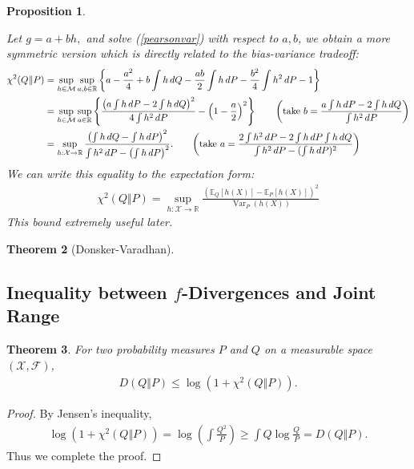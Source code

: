 \documentclass{article}
\numberwithin{equation}{section}
\newcommand{\E}{\mathbb{E}}
\newcommand{\bbR}{\mathbb{R}}
\DeclareMathOperator{\var}{Var}
\theoremstyle{plain}
\newtheorem{theorem}{Theorem}[section]
\newtheorem{proposition}[theorem]{Proposition}
\theoremstyle{definition}
\begin{document}
\begin{proposition}
\begin{itemize}
	Let $g = a+bh,$ and solve (\ref{pearsonvar}) with respect to $a,b$, we obtain a more symmetric version which is directly related to the bias-variance tradeoff:
	\begin{align*}
		\chi^2(Q\Vert P) &=\sup_{h\in\mathcal{M}}\sup_{a,b\in\bbR}\left\{a-\frac{a^2}{4}+b\int h\,dQ -\frac{ab}{2}\int h\,dP-\frac{b^2}{4}\int h^2\,dP - 1\right\}\\
		&=\sup_{h\in\mathcal{M}}\sup_{a\in\bbR}\left\{\frac{\left(a\int h\,dP-2\int h\,dQ\right)^2}{4\int h^2\,dP}-\left(1-\frac{a}{2}\right)^2\right\}\tag*{$\displaystyle\biggl(\text{take}\ b=\frac{a\int h\,dP-2\int h\,dQ}{\int h^2\,dP}\biggr)$}\\
		&= \sup_{h:\mathcal{X}\to\mathbb{R}}\frac{\left(\int h\,dQ-\int h\,dP\right)^2}{\int h^2\,dP - \left(\int h\,dP\right)^2}.\tag*{$\displaystyle\biggl(\text{take}\ a=\frac{2\int h^2\,dP-2\int h\,dP\int h\,dQ}{\int h^2\,dP-(\int h\,dP)^2}\biggr)$}
	\end{align*}
We can write this equality to the expectation form:
\begin{align}
	\chi^2(Q\Vert P)=\sup_{h:\mathcal{X}\to\mathbb{R}}\frac{\left(\E_Q[h(X)]-\E_P[h(X)]\right)^2}{\var_P(h(X))}\label{chisqdivvarrep}
\end{align}
This bound extremely useful later.
\end{itemize}
\end{proposition}

\begin{theorem}[Donsker-Varadhan]
\end{theorem}


\subsection{Inequality between $f$-Divergences and Joint Range}
\begin{theorem}
For two probability measures $P$ and $Q$ on a measurable space $(\mathcal{X},\mathscr{F})$,
\begin{align}\label{chisqklineq}
	D(Q\Vert P)\leq \log\left(1+\chi^2(Q\Vert P)\right).
\end{align}
\end{theorem}
\begin{proof}
By Jensen's inequality,
\begin{align*}
\log\left(1+\chi^2(Q\Vert P)\right)=\log\left(\int\frac{Q^2}{P}\right)\geq\int Q\log\frac{Q}{P}=D(Q\Vert P).
\end{align*}
Thus we complete the proof.
\end{proof}
\end{document}
